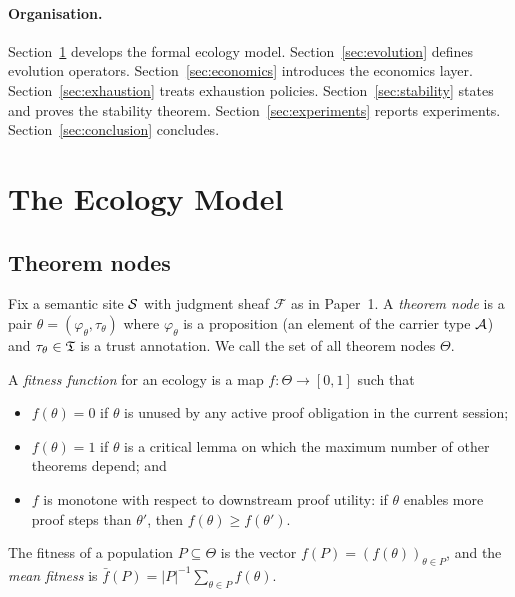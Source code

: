 \documentclass[11pt]{article}
\providecommand{\fit}{f}                    %
\providecommand{\fitbar}{\bar{f}}           %
\begin{document}
\paragraph{Organisation.}  Section~\ref{sec:ecology} develops the
formal ecology model.  Section~\ref{sec:evolution} defines evolution
operators.  Section~\ref{sec:economics} introduces the economics
layer.  Section~\ref{sec:exhaustion} treats exhaustion policies.
Section~\ref{sec:stability} states and proves the stability theorem.
Section~\ref{sec:experiments} reports experiments.
Section~\ref{sec:conclusion} concludes.

\section{The Ecology Model}\label{sec:ecology}

\subsection{Theorem nodes}

Fix a semantic site $\mathcal{S}$ with judgment sheaf $\mathcal{F}$ as in
Paper~1.  A \emph{theorem node} is a pair
$\theta = (\varphi_\theta, \tau_\theta)$ where $\varphi_\theta$ is a
proposition (an element of the carrier type $\mathcal{A}$) and
$\tau_\theta \in \mathfrak{T}$ is a trust annotation.  We call the set of
all theorem nodes $\Theta$.

\begin{definition}\label{def:fitness}
A \emph{fitness function} for an ecology is a map
$\fit : \Theta \to [0,1]$ such that
\begin{itemize}[leftmargin=1.5em]
  \item $\fit(\theta) = 0$ if $\theta$ is unused by any active proof
    obligation in the current session;
  \item $\fit(\theta) = 1$ if $\theta$ is a critical lemma on which
    the maximum number of other theorems depend; and
  \item $\fit$ is monotone with respect to downstream proof utility:
    if $\theta$ enables more proof steps than $\theta'$, then
    $\fit(\theta) \geq \fit(\theta')$.
\end{itemize}
The fitness of a population $P \subseteq \Theta$ is the vector
$\fit(P) = (\fit(\theta))_{\theta \in P}$, and the \emph{mean
fitness} is $\fitbar(P) = |P|^{-1}\sum_{\theta \in P}\fit(\theta)$.
\end{definition}
\end{document}
